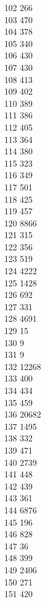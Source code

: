 { 102	266 \\
 103	470 \\
 104	378 \\
 105	340 \\
 106	430 \\
 107	430 \\
 108	413 \\
 109	402 \\
 110	389 \\
 111	386 \\
 112	405 \\
 113	364 \\
 114	380 \\
 115	323 \\
 116	349 \\
 117	501 \\
 118	425 \\
 119	457 \\
 120	8866 \\
 121	315 \\
 122	356 \\
 123	519 \\
 124	4222 \\
 125	1428 \\
 126	692 \\
 127	331 \\
 128	4691 \\
 129	15 \\
 130	9 \\
 131	9 \\
 132	12268 \\
 133	400 \\
 134	434 \\
 135	459 \\
 136	20682 \\
 137	1495 \\
 138	332 \\
 139	471 \\
 140	2739 \\
 141	448 \\
 142	439 \\
 143	361 \\
 144	6876 \\
 145	196 \\
 146	828 \\
 147	36 \\
 148	399 \\
 149	2406 \\
 150	271 \\
 151	420 \\
}

